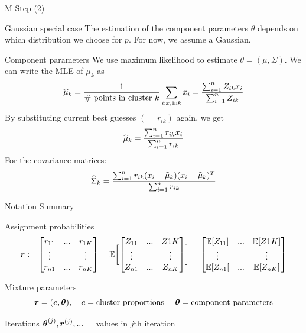 \documentclass[10pt]{beamer}
\newcommand{\Assign}{Z}
\newcommand{\soft}{r} %
\begin{document}
\begin{frame}{M-Step (2)}
\footnotesize
\begin{sblock}{Gaussian special case}
The estimation of the component parameters $\theta$ depends on which distribution we choose for $p$.  For now, we assume a Gaussian. 
\end{sblock}
\begin{sblock}{Component parameters}
We use maximum likelihood to estimate $\theta=(\mu, \Sigma)$.  We can write the MLE of $\mu_k$ as 
\[ \widehat{\mu}_k =  \df{1}{\text{\# points in cluster } k}  \ds\sum_{i : x_i \text{in} k} x_i = \df{\sum_{i=1}^n  \Assign_{ik} x_i} {\sum_{i=1}^n \Assign_{ik}}\]
By substituting current best guesses $(=\soft_{ik})$ again, we get
\[ \widehat{\mu}_k = \df{\sum_{i=1}^n  \soft_{ik} x_i}{\sum_{i=1}^n \soft_{ik}}\]
For the covariance matrices:
\[ \widehat{\Sigma}_k = \df{ \sum_{i=1}^n \soft_{ik} (x_i - \widehat{\mu}_k ) (x_i - \widehat{\mu}_k )^T }{ \sum_{i=1}^n \soft_{ik}} \]
\end{sblock}
\end{frame}

\begin{frame}{Notation Summary}
\begin{sblock}{Assignment probabilities}
\[ 
 \+\soft := 
\begin{bmatrix}
\soft_{11} & ... & \soft_{1K}\\
\vdots & & \vdots \\
\soft_{n1} & ... &  \soft_{nK}\\
\end{bmatrix} 
= \E \bb{
\begin{bmatrix}
\Assign_{11} & ... & \Assign{1K}\\
\vdots & & \vdots \\
\Assign_{n1} & ... &  \Assign_{nK}\\
\end{bmatrix} 
} =
\begin{bmatrix}
\E[\Assign_{11}] & ... & \E[\Assign{1K}]\\
\vdots & & \vdots \\
\E[\Assign_{n1}[ & ... &  \E[\Assign_{nK}]\\
\end{bmatrix} 
 \]
 
\end{sblock}
\begin{sblock}{Mixture parameters}
\[ {\boldsymbol \tau} = ({\boldsymbol c}, {\boldsymbol \theta}), \quad {\boldsymbol c} = \text{cluster proportions } \quad {\boldsymbol \theta} = \text{component parameters} \]
\end{sblock}
\begin{sblock}{Iterations}
$\+\theta^{(j)}, \+\soft^{(j)}, ...$ = values in $j$th iteration 
\end{sblock}
\end{frame}
\end{document}
